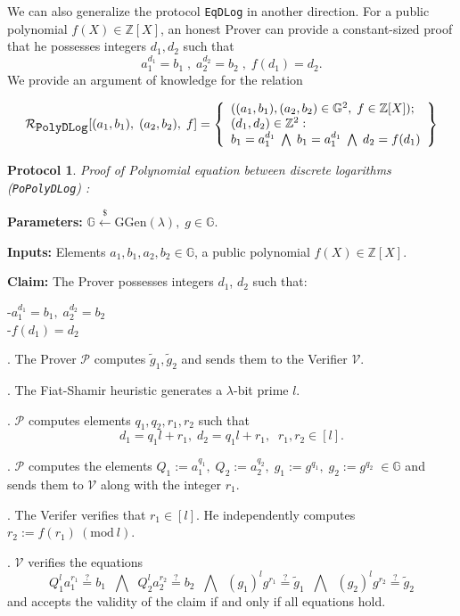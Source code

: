 \documentclass[11pt, lettersize, notitlepage, leqno, footskip=0.6cm]{article}
\newcommand{\bz}{\mathbb Z}
\newcommand{\wti}{\widetilde}
\newcommand{\mc}{\mathcal}
\newcommand{\mb}{\mathbb}
\newcommand{\mr}{\mathrm}
\newcommand{\lamb}{\lambda}
\newcommand{\vs}{\vspace{-0.15cm}}
\newcommand{\Mod}[1]{\ (\mathrm{mod}\ #1)}
\newtheorem{Prot}[Thm]{Protocol}
\numberwithin{equation}{section}
\begin{document}
\bigskip


\noindent We can also generalize the protocol \verb|EqDLog| in another direction. For a public polynomial {$f(X)\in \bz[X]$}, an honest Prover can provide a constant-sized proof that he possesses integers $d_1,d_2$ such that \vs $$a_1^{d_1} = b_1\;,\;a_2^{d_2} = b_2\;,\;f(d_1) = d_2.$$ We provide an argument of knowledge for the relation 

\[
  \mc{R}_{{\protect\verb|PolyDLog|}}[(a_1, b_1),\;(a_2,b_2),\;f] = \left\{\begin{array}{l}
    ((a_1, b_1), (a_2,b_2)\in\mb{G}^2,\;f\in\bz[X]);\\
    (d_1, d_2)\in\mb{Z}^2: \\
    b_1 = a_1^{d_1}\; \bigwedge\; b_1 = a_1^{d_1}\; \bigwedge \;d_2 = f(d_1)
  \end{array}\right\}
\] 

\vspace{0.2cm}


\begin{Prot} \normalfont \textit{Proof of Polynomial equation between discrete logarithms} (\verb|PoPolyDLog|) :\end{Prot} \vspace{-0.3cm}

\noindent \textbf{Parameters:} $\mb{G}\xleftarrow{\$} \mr{GGen}(\lamb), \; g\in \mb{G}$.

\noindent \textbf{Inputs:} Elements $a_1, b_1, a_2, b_2\in \mb{G}$, a public polynomial $f(X)\in\bz[X]$.

\noindent \textbf{Claim:} The Prover possesses integers $d_1$, $d_2$ such that:

\noindent -$a_1^{d_1} = b_1,\;  a_2^{d_2} = b_2$\\
-$f(d_1) = d_2$

\begin{prf1}. The Prover $\mc{P}$ computes $\wti{g}_1, \wti{g}_2$ and sends them to the Verifier $\mc{V}$.

. The Fiat-Shamir heuristic generates a $\lamb$-bit prime $l$.

. $\mc{P}$ computes elements $q_1, q_2, r_1, r_2$ such that \vs $$d_1 = q_1l+r_1,\; d_2 = q_1l+r_1,\;\; r_1,r_2\in [l].$$

. $\mc{P}$ computes the elements $Q_1:= a_1^{q_1},\;Q_2:= a_2^{q_2},\; g_1:= g^{q_1},\; g_2:= g^{q_2}\;\in\mb{G}$ and sends them to $\mc{V}$ along with the integer $r_1$.

. The Verifer verifies that $r_1\in [l]$. He independently computes $r_2:= f(r_1)\Mod{l}$.

. $\mc{V}$ verifies the equations \vs $$Q_1^{l}a_1^{r_1}\stackrel{?}{=} b_1\;\;\bigwedge\;\; Q_2^{l}a_2^{r_2}\stackrel{?}{=} b_2 \;\;\bigwedge\;\; (g_1)^lg^{r_1} \stackrel{?}{=} \wti{g}_1\;\;\bigwedge\;\; (g_2)^lg^{r_2} \stackrel{?}{=} \wti{g}_2 $$ and accepts the validity of the claim if and only if all equations hold.\end{prf1}
\end{document}
